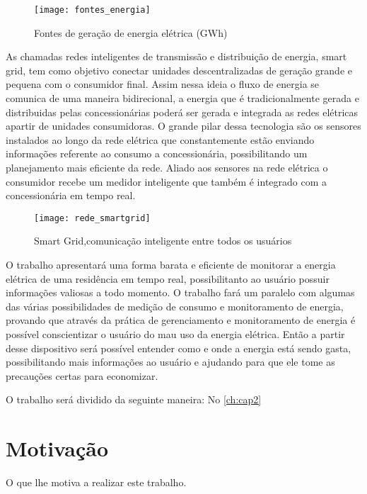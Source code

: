 \begin{figure}[h!]
	\texttt{[image: fontes\_energia]}
	\centering
	\caption[Fontes de geração de energia elétrica (GWh)]{Fontes de geração de energia elétrica (GWh)}
	\label{fig:fonte_energia}
\end{figure}
\FloatBarrier

As chamadas redes inteligentes de transmissão e distribuição de energia, smart grid, tem como objetivo conectar unidades descentralizadas de geração
grande e pequena com o consumidor final. Assim nessa ideia o fluxo de energia se comunica de uma maneira bidirecional, a energia que é tradicionalmente
gerada e distribuidas pelas concessionárias poderá ser gerada e integrada as redes elétricas apartir de unidades consumidoras. O grande pilar dessa 
tecnologia são os sensores instalados ao longo da rede elétrica que constantemente estão enviando informações referente ao consumo a concessionária,
possibilitando um planejamento mais eficiente da rede. Aliado aos sensores na rede elétrica o consumidor recebe um medidor inteligente que também
é integrado com a concessionária em tempo real.

\begin{figure}[h!]
	\texttt{[image: rede\_smartgrid]}
	\centering
	\caption[Smart Grid,comunicação inteligente entre todos os usuários]{Smart Grid,comunicação inteligente entre todos os usuários}
	\label{fig:rede_smartgrid}
\end{figure}
\FloatBarrier

O trabalho apresentará uma forma barata e eficiente de monitorar a energia elétrica de uma residência em tempo real, possibilitanto ao usuário
possuir informações valiosas a todo momento. O trabalho fará um paralelo com algumas das várias possibilidades de medição de consumo e monitoramento
de energia, provando que através da prática de gerenciamento e monitoramento de energia é possível conscientizar o usuário do mau uso da energia elétrica.
Então a partir desse dispositivo será possível entender como e onde a energia está sendo gasta, possibilitando mais informações ao usuário e ajudando para
que ele tome as precauções certas para economizar.

O trabalho será dividido da seguinte maneira: No \autoref{ch:cap2}

\section{Motivação}
O que lhe motiva a realizar este trabalho.

